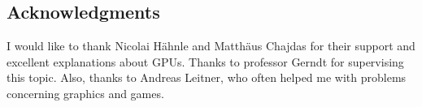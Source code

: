 \newpage
\vspace*{3.5cm}
\begin{center}
\begin{minipage}{12.5cm}
\section*{Acknowledgments}%
I would like to thank Nicolai Hähnle and Matthäus Chajdas for their support and excellent explanations about GPUs.
Thanks to professor Gerndt for supervising this topic.
Also, thanks to Andreas Leitner, who often helped me with problems concerning graphics and games.
\end{minipage}
\end{center}
